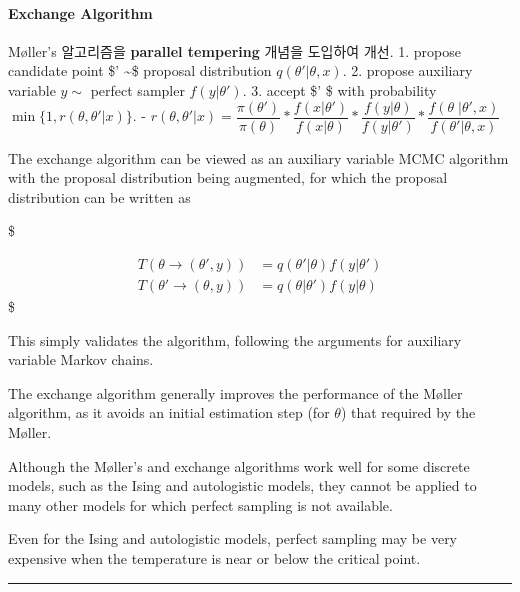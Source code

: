 \documentclass[
]{book}
\begin{document}
\hypertarget{exchange-algorithm}{%
\paragraph{Exchange Algorithm}\label{exchange-algorithm}}

Møller's 알고리즘을 \textbf{parallel tempering} 개념을 도입하여 개선.
1. propose candidate point \$\theta' \sim \$ proposal distribution \(q(\theta' \vert \theta, x)\).
2. propose auxiliary variable \(y \sim\) perfect sampler \(f(y \vert \theta ' )\).
3. accept \$\theta' \$ with probability \(\min \{ 1, r(\theta, \theta' \vert x) \}\).
- \(r(\theta, \theta' \vert x) = \dfrac{\pi(\theta') }{\pi(\theta) } \ast \dfrac{f(x \vert \theta ') }{f(x \vert \theta)} \ast \dfrac{f(y \vert \theta) }{f(y \vert \theta')} \ast \dfrac{f(\theta \; \vert \theta', x) }{f(\theta' \vert \theta, x)}\)

The exchange algorithm can be viewed as an auxiliary variable MCMC algorithm with the proposal distribution being augmented, for which the proposal distribution can be written as

\$

\begin{align}

T \left( \theta \rightarrow (\theta' , y) \right) &= q(\theta ' \vert \theta) f(y \vert \theta ') \\
T \left( \theta' \rightarrow (\theta , y) \right) &= q(\theta \vert \theta ' ) f(y \vert \theta)


\end{align}
\$

This simply validates the algorithm, following the arguments for auxiliary variable Markov chains.

The exchange algorithm generally improves the performance of the Møller algorithm, as it avoids an initial estimation step (for \(\theta\)) that required by the Møller.

Although the Møller's and exchange algorithms work well for some discrete models, such as the Ising and autologistic models, they cannot be applied to many other models for which perfect sampling is not available.

Even for the Ising and autologistic models, perfect sampling may be very expensive when the temperature is near or below the critical point.

\begin{center}\rule{0.5\linewidth}{0.5pt}\end{center}
\end{document}
